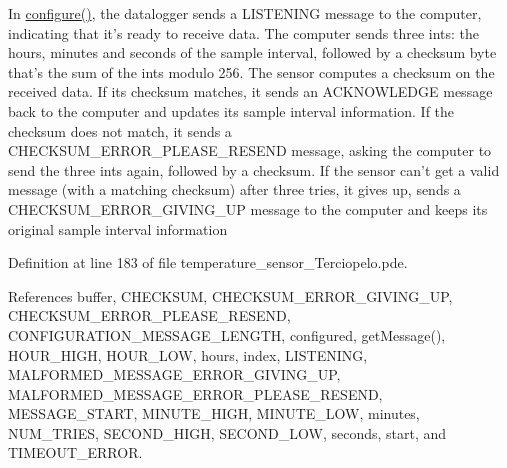 In \hyperlink{nublogger_8h_e369b3765489ee8bd0ea791c1843630f}{configure()}, the datalogger sends a LISTENING message to the computer, indicating that it's ready to receive data. The computer sends three ints: the hours, minutes and seconds of the sample interval, followed by a checksum byte that's the sum of the ints modulo 256. The sensor computes a checksum on the received data. If its checksum matches, it sends an ACKNOWLEDGE message back to the computer and updates its sample interval information. If the checksum does not match, it sends a CHECKSUM\_\-ERROR\_\-PLEASE\_\-RESEND message, asking the computer to send the three ints again, followed by a checksum. If the sensor can't get a valid message (with a matching checksum) after three tries, it gives up, sends a CHECKSUM\_\-ERROR\_\-GIVING\_\-UP message to the computer and keeps its original sample interval information 

Definition at line 183 of file temperature\_\-sensor\_\-Terciopelo.pde.

References buffer, CHECKSUM, CHECKSUM\_\-ERROR\_\-GIVING\_\-UP, CHECKSUM\_\-ERROR\_\-PLEASE\_\-RESEND, CONFIGURATION\_\-MESSAGE\_\-LENGTH, configured, getMessage(), HOUR\_\-HIGH, HOUR\_\-LOW, hours, index, LISTENING, MALFORMED\_\-MESSAGE\_\-ERROR\_\-GIVING\_\-UP, MALFORMED\_\-MESSAGE\_\-ERROR\_\-PLEASE\_\-RESEND, MESSAGE\_\-START, MINUTE\_\-HIGH, MINUTE\_\-LOW, minutes, NUM\_\-TRIES, SECOND\_\-HIGH, SECOND\_\-LOW, seconds, start, and TIMEOUT\_\-ERROR.

